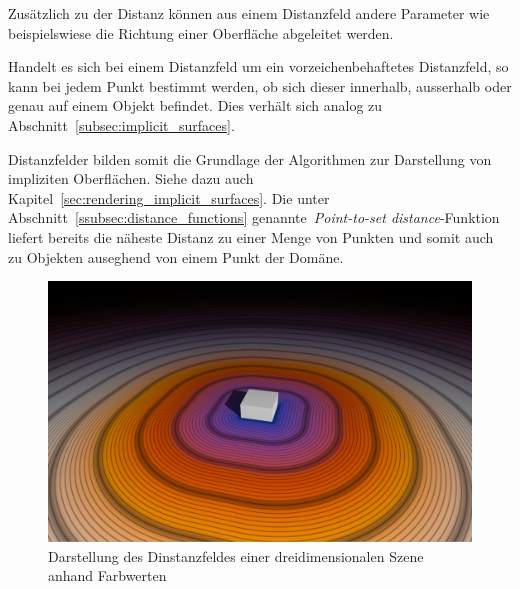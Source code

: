 Zusätzlich zu der Distanz können aus einem Distanzfeld andere Parameter
wie beispielswiese die Richtung einer Oberfläche abgeleitet werden.

Handelt es sich bei einem Distanzfeld um ein vorzeichenbehaftetes
Distanzfeld, so kann bei jedem Punkt bestimmt werden, ob sich dieser
innerhalb, ausserhalb oder genau auf einem Objekt befindet. Dies verhält
sich analog zu Abschnitt~\ref{subsec:implicit_surfaces}.

Distanzfelder bilden somit die Grundlage der Algorithmen zur Darstellung
von impliziten Oberflächen. Siehe dazu auch
Kapitel~\ref{sec:rendering_implicit_surfaces}. Die unter
Abschnitt~\ref{ssubsec:distance_functions} genannte~\textit{Point-to-set
    distance}-Funktion  liefert bereits die näheste Distanz zu einer
Menge von Punkten und somit auch zu Objekten auseghend von einem Punkt
der Domäne.

\begin{figure}[H]
    \centering
    \includegraphics[width=1.0\textwidth]{img/distance_field.pdf}
    \caption{Darstellung des Dinstanzfeldes einer dreidimensionalen
        Szene anhand Farbwerten\protect\footnotemark}\label{
        fig:distance_field_illustration}
\end{figure}
